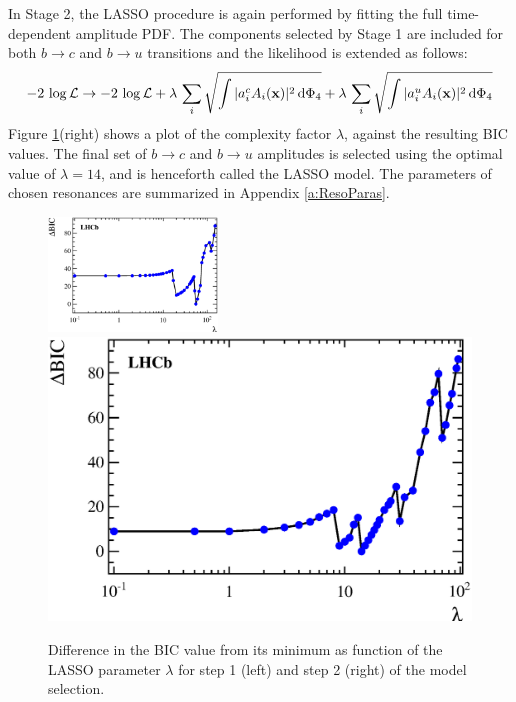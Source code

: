 \enlargethispage{3\baselineskip}
In Stage 2, the LASSO procedure is again performed by fitting the full time-dependent amplitude PDF.
The components selected by Stage 1 are included for both $b\to c$ and $b\to u$ transitions and the likelihood is extended as follows:
\begin{equation}
	-2 \, \log \mathcal L \rightarrow -2 \, \log \mathcal L + \lambda \, \sum_{i} \sqrt{ \int \vert a^{c}_i  A_i(\mathbf{x}) \vert^{2} \, \text{d}\Phi_{4}  }  + \lambda \, \sum_{i} \sqrt{ \int \vert a^{u}_i  A_i(\mathbf{x}) \vert^{2} \, \text{d}\Phi_{4}  } 
\end{equation}
Figure \ref{fig:BIC}(right) shows a plot of the complexity factor
$\lambda$, against the resulting BIC values. 
The final set of $b\to c$ and $b\to u$ amplitudes is selected using the optimal value of $\lambda=14$, and is henceforth called the LASSO model.
The parameters of chosen resonances are summarized in Appendix \ref{a:ResoParas}.
%
\begin{figure}[h]
  \centering
  \includegraphics[width=0.4\textwidth, height=!]{figs/lassoFit/Lasso_BIC.eps} 
  \includegraphics[width=0.4\linewidth, height=!]{figs/lassoFit/Lasso2_BIC.eps}
  \caption{Difference in the BIC value from its minimum as function of the LASSO parameter $\lambda$ for step 1 (left) and step 2 (right) of the model selection.}
  \label{fig:BIC}
\end{figure}
%
\begin{table}[h]
\centering
\caption{
\small Fit fractions of the amplitudes selected by Stage 1 of the model selection procedure.
}

\label{tab:lassoFit}
\end{table}

